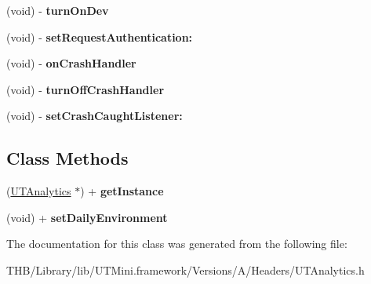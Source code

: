 \begin{DoxyCompactItemize}
(void) -\/ {\bfseries turn\+On\+Dev}
\item 
\mbox{\label{interface_u_t_analytics_ab22557eeb4be4d10f549d9b72bfab160}} 
(void) -\/ {\bfseries set\+Request\+Authentication\+:}
\item 
\mbox{\label{interface_u_t_analytics_a358149c562e073d73f998d048f49b7bb}} 
(void) -\/ {\bfseries on\+Crash\+Handler}
\item 
\mbox{\label{interface_u_t_analytics_a08eef788591a926a7f9cb02c22d73f0e}} 
(void) -\/ {\bfseries turn\+Off\+Crash\+Handler}
\item 
\mbox{\label{interface_u_t_analytics_ae1677644fde0d31f99b4d1e0d8dd6ca0}} 
(void) -\/ {\bfseries set\+Crash\+Caught\+Listener\+:}
\end{DoxyCompactItemize}
\subsection*{Class Methods}
\begin{DoxyCompactItemize}
\item 
\mbox{\label{interface_u_t_analytics_af4c75614e8b463bcba1c36ec2be54ca3}} 
(\mbox{\hyperlink{interface_u_t_analytics}{U\+T\+Analytics}} $\ast$) + {\bfseries get\+Instance}
\item 
\mbox{\label{interface_u_t_analytics_a4b55e87906bec9509fdfde68a03e093f}} 
(void) + {\bfseries set\+Daily\+Environment}
\end{DoxyCompactItemize}


The documentation for this class was generated from the following file\+:\begin{DoxyCompactItemize}
\item 
T\+H\+B/\+Library/lib/\+U\+T\+Mini.\+framework/\+Versions/\+A/\+Headers/U\+T\+Analytics.\+h\end{DoxyCompactItemize}
